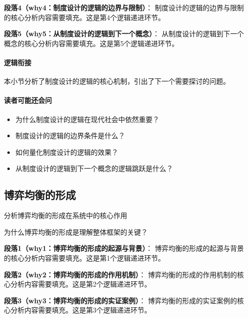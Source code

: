 \documentclass[../main.tex]{subfiles}
\begin{document}
\textbf{段落4（why4：制度设计的逻辑的边界与限制）}：
制度设计的逻辑的边界与限制的核心分析内容需要填充。这是第4个逻辑递进环节。


\textbf{段落5（why5：从制度设计的逻辑到下一个概念）}：
从制度设计的逻辑到下一个概念的核心分析内容需要填充。这是第5个逻辑递进环节。


\paragraph*{逻辑衔接}
本小节分析了制度设计的逻辑的核心机制，引出了下一个需要探讨的问题。

\paragraph*{读者可能还会问}
\begin{itemize}
\item 为什么制度设计的逻辑在现代社会中依然重要？
\item 制度设计的逻辑的边界条件是什么？
\item 如何量化制度设计的逻辑的效果？
\item 从制度设计的逻辑到下一个概念的逻辑跳跃是什么？
\end{itemize}


\subsection{博弈均衡的形成}

\begin{motivation}
分析博弈均衡的形成在系统中的核心作用
\end{motivation}

\begin{logicmap}
[逻辑链占位]
\end{logicmap}

\begin{questionbox}
为什么博弈均衡的形成是理解整体框架的关键？
\end{questionbox}

\textbf{段落1（why1：博弈均衡的形成的起源与背景）}：
博弈均衡的形成的起源与背景的核心分析内容需要填充。这是第1个逻辑递进环节。


\textbf{段落2（why2：博弈均衡的形成的作用机制）}：
博弈均衡的形成的作用机制的核心分析内容需要填充。这是第2个逻辑递进环节。


\textbf{段落3（why3：博弈均衡的形成的实证案例）}：
博弈均衡的形成的实证案例的核心分析内容需要填充。这是第3个逻辑递进环节。
\end{document}
